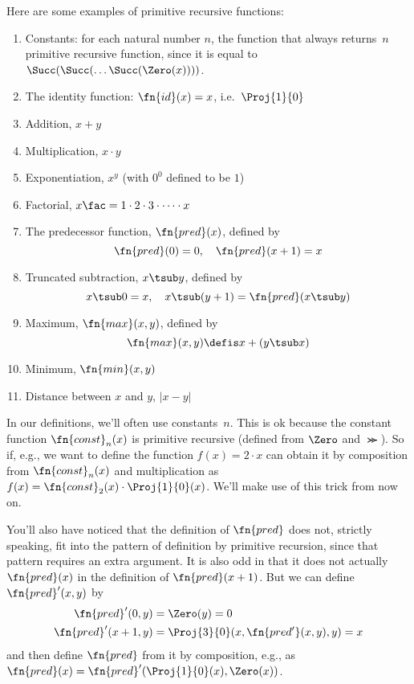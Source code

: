 \documentclass[../../../include/open-logic-section]{subfiles}
\begin{document}


Here are some examples of primitive recursive functions:
\begin{enumerate}
\item Constants: for each natural number $n$, the function that always
  returns~$n$ primitive recursive function, since it is equal to
  $\Succ(\Succ(\dots \Succ(\Zero(x))))$.

\item The identity function: $\fn{id}(x) = x$, i.e.\ $\Proj{1}{0}$

\item Addition, $x+y$

\item Multiplication, $x \cdot y$

\item Exponentiation, $x^y$ (with $0^0$ defined to be $1$)

\item Factorial, $x\fac = 1 \cdot 2 \cdot 3 \cdot \cdots \cdot x$

\item The predecessor function, $\fn{pred}(x)$, defined by
\[
\fn{pred}(0) = 0, \quad \fn{pred}(x+1) = x
\]

\item Truncated subtraction, $x \tsub y$, defined by
\[
x \tsub 0 = x, \quad x \tsub (y+1) = \fn{pred}(x \tsub y)
\]

\item Maximum, $\fn{max}(x,y)$, defined by
\[
\fn{max}(x,y) \defis x + (y \tsub x)
\]

\item Minimum, $\fn{min}(x,y)$

\item Distance between $x$ and $y$, $\left|x-y\right|$
\end{enumerate}

\begin{explain}
In our definitions, we'll often use constants~$n$. This is ok because
the constant function $\fn{const}_n(x)$ is primitive recursive
(defined from $\Zero$ and $\Succ$). So if, e.g., we want to define the
function $f(x) = 2 \cdot x$ can obtain it by composition from
$\fn{const}_n(x)$ and multiplication as $f(x) = \fn{const}_2(x) \cdot
\Proj{1}{0}(x)$. We'll make use of this trick from now on.
  
You'll also have noticed that the definition of $\fn{pred}$ does not,
strictly speaking, fit into the pattern of definition by primitive
recursion, since that pattern requires an extra argument. It is also
odd in that it does not actually $\fn{pred}(x)$ in the definition of
$\fn{pred}(x+1)$. But we can define $\fn{pred}'(x, y)$ by
\begin{align*}
  \fn{pred}'(0, y) & = \Zero(y) = 0\\
  \fn{pred}'(x+1, y) & = \Proj{3}{0}(x, \fn{pred'}(x, y), y) = x
\end{align*}
and then define $\fn{pred}$ from it by composition, e.g., as $\fn{pred}(x) =
\fn{pred}'(\Proj{1}{0}(x), \Zero(x))$.
\end{explain}
\end{document}
